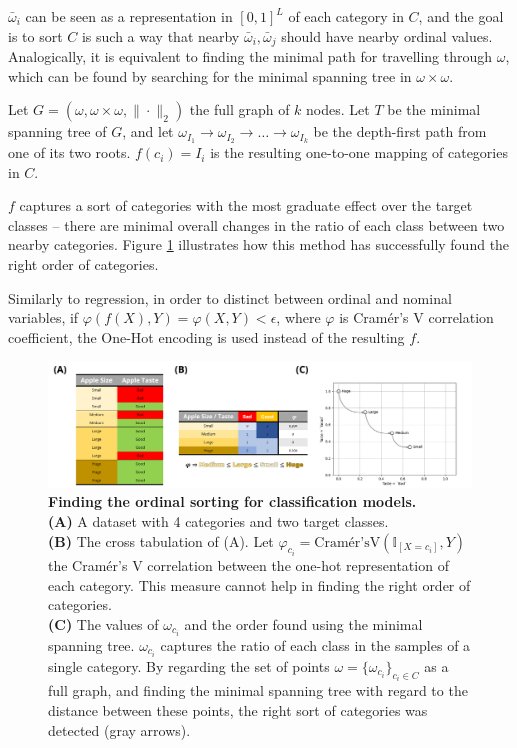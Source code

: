 \documentclass{article}
\begin{document}
$\bar{\omega}_i$ can be seen as a representation in $[0,1]^L$ of each category in $C$, and the goal is to sort $C$ is such a way that nearby $\bar{\omega}_i, \bar{\omega}_j$ should have nearby ordinal values. Analogically, it is equivalent to finding the minimal path for travelling through $\omega$, which can be found by searching for the minimal spanning tree in $\omega \times \omega$.

Let $G=(\omega, \omega \times \omega, \|\cdot\|_2)$ the full graph of $k$ nodes. Let $T$ be the minimal spanning tree of $G$, and let $\omega_{I_1} \to \omega_{I_2} \to \dots \to \omega_{I_k}$ be the depth-first path from one of its two roots. $f(c_i) = I_i$ is the resulting one-to-one mapping of categories in $C$.

$f$ captures a sort of categories with the most graduate effect over the target classes -- there are minimal overall changes in the ratio of each class between two nearby categories. Figure \ref{figure:fig2} illustrates how this method has successfully found the right order of categories.

Similarly to regression, in order to distinct between ordinal and nominal variables, if $\varphi(f(X), Y) = \varphi(X, Y) < \epsilon$, where $\varphi$ is Cramér's V correlation coefficient, the One-Hot encoding is used instead of the resulting $f$.

\begin{figure}
\includegraphics[width=\textwidth]{imgs/figure2}

\caption{\label{figure:fig2}
\textbf{Finding the ordinal sorting for classification models.} \\
\textbf{(A)} A dataset with 4 categories and two target classes. \\
\textbf{(B)} The cross tabulation of (A). Let $\varphi_{c_i} = \text{Cramér'sV}(\mathbb{I}_{[X = c_i]}, Y)$ the Cramér's V correlation between the one-hot representation of each category. This measure cannot help in finding the right order of categories. \\
\textbf{(C)} The values of $\omega_{c_i}$ and the order found using the minimal spanning tree. $\omega_{c_i}$ captures the ratio of each class in the samples of a single category. By regarding the set of points $\omega = \{\omega_{c_i}\}_{c_i \in C}$ as a full graph, and finding the minimal spanning tree with regard to the distance between these points, the right sort of categories was detected (gray arrows).
}
\end{figure}
\end{document}
